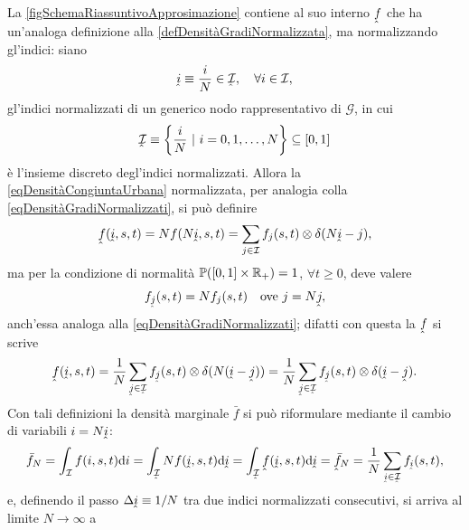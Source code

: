             \begin{oss}
                La \cref{figSchemaRiassuntivoApprosimazione} contiene al suo interno \(\underhat f\) che ha un'analoga definizione alla \cref{defDensitàGradiNormalizzata}, ma normalizzando gl'indici: siano
                \[
                    \underhat i\equiv\frac iN\in\underhat{\mathcal I},\quad\forall i\in\mathcal I,
                \]
                gl'indici normalizzati di un generico nodo rappresentativo di \(\mathcal G\), in cui
                \[
                    \underhat{\mathcal I}\equiv\left\{\frac iN\ |\ i=0,1,\ldots,N\right\}\subseteq[0,1]
                \]
                è l'insieme discreto degl'indici normalizzati. Allora la \cref{eqDensitàCongiuntaUrbana} normalizzata, per analogia colla \cref{eqDensitàGradiNormalizzati}, si può definire
                \[
                    \underhat f(\underhat i,s,t)=Nf(N\underhat i,s,t)=\sum_{j\in\mathcal I}f_j(s,t)\otimes\delta(N\underhat i-j),
                \]
                ma per la condizione di normalità \(\mathbb P([0,1]\times\mathbb R_+)=1\), \(\forall t\geq0\), deve valere\footnotemark{}%
                \[
                    f_{\underhat j}(s,t)=Nf_j(s,t)\quad\text{ove }j=N\underhat j,
                \]
                anch'essa analoga alla \cref{eqDensitàGradiNormalizzati}; difatti con questa la \(\underhat f\) si scrive
                \[
                    \underhat f(\underhat i,s,t)
                    =\frac1N\sum_{\underhat j\in\underhat{\mathcal I}}f_{\underhat j}(s,t)\otimes\delta(N(\underhat i-\underhat j))
                    =\frac1N\sum_{\underhat j\in\underhat{\mathcal I}}f_{\underhat j}(s,t)\otimes\delta(\underhat i-\underhat j).
                \]
                Con tali definizioni la densità marginale \(\bar f\) si può riformulare mediante il cambio di variabili \(i=N\underhat i\):
                \[
                    \bar f_N
                    =\int_{\mathcal I}f(i,s,t)\de i
                    =\int_{\underhat{\mathcal I}}Nf(\underhat i,s,t)\de\underhat i
                    =\int_{\underhat{\mathcal I}}\underhat f(\underhat i,s,t)\de\underhat i
                    =\underhat{\bar f}_N
                    =\frac1N\sum_{\underhat i\in\underhat{\mathcal I}}f_{\underhat i}(s,t),
                \]
                e, definendo il passo \(\Delta\underhat i\equiv1/N\) tra due indici normalizzati consecutivi, si arriva al limite \(N\to\infty\) a

\end{oss}
